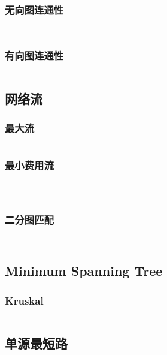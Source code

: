 \documentclass[a4paper,11pt]{article}
\begin{document}
{\subsubsection{无向图连通性} %
\inputminted[breaklines]{c++}{图论/图的连通性/无向图连通性/边双连通分量.cpp} %
\inputminted[breaklines]{c++}{图论/图的连通性/无向图连通性/点双连通分量.cpp} %
\subsubsection{有向图连通性} %
\inputminted[breaklines]{c++}{图论/图的连通性/有向图连通性/强连通分量.cpp} %
\subsection{网络流} %
\subsubsection{最大流} %
\inputminted[breaklines]{c++}{图论/网络流/最大流/最大流.cpp} %
\subsubsection{最小费用流} %
\inputminted[breaklines]{c++}{图论/网络流/最小费用流/mcmf(augement).cpp} %
\inputminted[breaklines]{c++}{图论/网络流/最小费用流/mcmf(dijkstra).cpp} %
\inputminted[breaklines]{c++}{图论/网络流/最小费用流/mcmf(spfa).cpp} %
\subsubsection{二分图匹配} %
\inputminted[breaklines]{c++}{图论/网络流/二分图匹配/匈牙利算法.cpp} %
\inputminted[breaklines]{c++}{图论/网络流/二分图匹配/Hopcroft-Karp算法.cpp} %


\subsection{Minimum Spanning Tree} %
\subsubsection{Kruskal} %
\inputminted[breaklines]{c++}{graph/kruskal.cc} %
\subsection{单源最短路}
}
\end{document}
